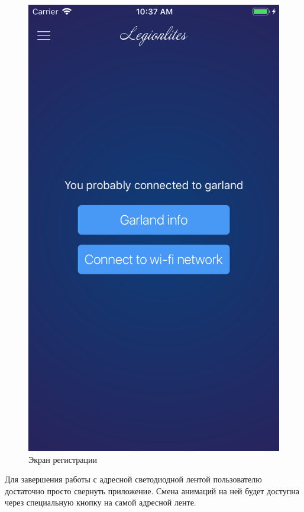 \begin{figure}[H]
\centering
	\includegraphics[scale=0.2]{figures/userGuide/device.png}
	\caption{Экран регистрации}
	\label{fig:develop:userGuide:device}
\end{figure}

Для завершения работы с адресной светодиодной лентой пользователю достаточно просто свернуть приложение. Смена анимаций на ней будет доступна через специальную кнопку на самой адресной ленте.

